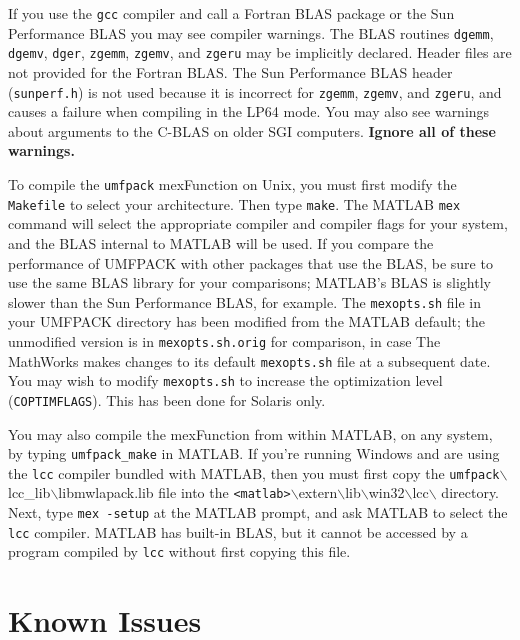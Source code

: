 If you use the {\tt gcc} compiler and call a Fortran BLAS package or the Sun
Performance BLAS you may see compiler warnings.  The BLAS routines
{\tt dgemm}, {\tt dgemv}, {\tt dger}, {\tt zgemm}, {\tt zgemv}, and {\tt zgeru}
may be implicitly declared.  Header files are not provided for the Fortran
BLAS.  The Sun Performance BLAS header ({\tt sunperf.h}) is not used
because it is incorrect for {\tt zgemm}, {\tt zgemv}, and {\tt zgeru}, and
causes a failure when compiling in the LP64 mode.
You may also see warnings about arguments to the C-BLAS on older SGI
computers.  {\bf Ignore all of these warnings.}

To compile the {\tt umfpack} mexFunction on Unix, you must first modify
the {\tt Makefile} to select your architecture.  Then type {\tt make}.
The MATLAB {\tt mex} command will select the appropriate compiler and compiler
flags for your system, and the BLAS internal to MATLAB will be used.  If you
compare the performance of UMFPACK with other packages that use the BLAS,
be sure to use the same BLAS library for your comparisons; MATLAB's BLAS is
slightly slower than the Sun Performance BLAS, for example.  The
{\tt mexopts.sh} file in your UMFPACK directory has been modified from the
MATLAB default; the unmodified version is in {\tt mexopts.sh.orig} for
comparison, in case The MathWorks makes changes to its default {\tt mexopts.sh}
file at a subsequent date.  You may wish to modify {\tt mexopts.sh}
to increase the optimization level ({\tt COPTIMFLAGS}).  This has been
done for Solaris only.

You may also compile the mexFunction from within MATLAB, on any system,
by typing {\tt umfpack\_make} in MATLAB.
If you're running Windows and are
using the {\tt lcc} compiler bundled with MATLAB, then you must first
copy the {\tt umfpack}$\backslash${lcc\_lib}$\backslash${libmwlapack.lib}
file into the
{\tt <matlab>}$\backslash${extern}$\backslash${lib}$\backslash${win32}$\backslash${lcc}$\backslash$
directory.  Next, type {\tt mex -setup}
at the MATLAB prompt, and ask MATLAB to select the {\tt lcc} compiler.
MATLAB has built-in BLAS, but it cannot be accessed by a program
compiled by {\tt lcc} without first copying this file.


\section{Known Issues}

